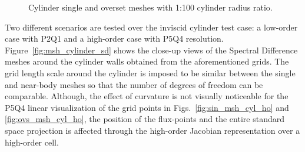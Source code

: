 \begin{figure}[H]
{		\label{fig:overset_msh_32_cp}
    }
    \hfill
    \hfill
    \caption{Cylinder single and overset meshes with 1:100 cylinder radius ratio.}
    \label{fig:sin_cyl_mesh}
\end{figure}

Two different scenarios are tested over the inviscid cylinder test case: a low-order case with P2Q1 and a high-order case with P5Q4 resolution. Figure\ \ref{fig:msh_cylinder_sd} shows the close-up views of the Spectral Difference meshes around the cylinder walls obtained from the aforementioned grids. The grid length scale around the cylinder is imposed to be similar between the single and near-body meshes so that the number of degrees of freedom can be comparable. Although, the effect of curvature is not visually noticeable for the P5Q4 linear visualization of the grid points in Figs.\ \ref{fig:sin_msh_cyl_ho} and \ref{fig:ovs_msh_cyl_ho}, the position of the flux-points and the entire standard space projection is affected through the high-order Jacobian representation over a high-order cell.

